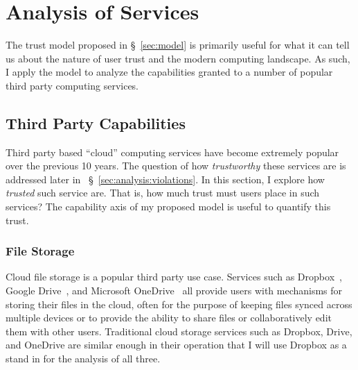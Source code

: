 \section{Analysis of Services}
\label{sec:analysis}

The trust model proposed in \S~\ref{sec:model} is primarily useful for
what it can tell us about the nature of user trust and the modern
computing landscape. As such, I apply the model to analyze the
capabilities granted to a number of popular third party computing
services.

\subsection{Third Party Capabilities}
\label{sec:analysis:capabilites}

Third party based ``cloud'' computing services have become extremely
popular over the previous 10 years.  The question of how
\textit{trustworthy} these services are is addressed later in
~\S~\ref{sec:analysis:violations}. In this section, I explore how
\textit{trusted} such service are. That is, how much trust must users
place in such services? The capability axis of my proposed model is
useful to quantify this trust.

\subsubsection{File Storage}

Cloud file storage is a popular third party use case. Services such as
Dropbox~\cite{dropbox}, Google Drive~\cite{google-drive}, and
Microsoft OneDrive~\cite{microsoft-onedrive} all provide users with
mechanisms for storing their files in the cloud, often for the purpose
of keeping files synced across multiple devices or to provide the
ability to share files or collaboratively edit them with other
users. Traditional cloud storage services such as Dropbox, Drive, and
OneDrive are similar enough in their operation that I will use Dropbox
as a stand in for the analysis of all three.

